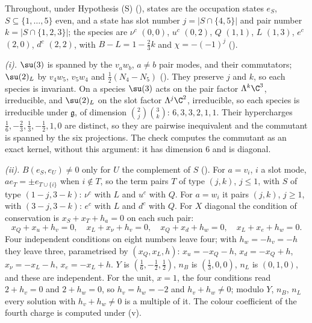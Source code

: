 Throughout, under Hypothesis (S) (), states are the occupation states $e_{S}$, $S \subseteq \{1, \dots, 5\}$ even, and a state has slot number $j = |S \cap \{4, 5\}|$ and pair number $k = |S \cap \{1, 2, 3\}|$; the species are $\nu^{c}$ $(0,0)$, $u^{c}$ $(0,2)$, $Q$ $(1,1)$, $L$ $(1,3)$, $e^{c}$ $(2,0)$, $d^{c}$ $(2,2)$, with $B - L = 1 - \tfrac23 k$ and $\chi = -(-1)^{j}$ ().

\emph{(i).} $\su(3)$ is spanned by the $v_{a}w_{b}$, $a \neq b$ pair modes, and their commutators; $\su(2)_{L}$ by $v_{4}w_{5}$, $v_{5}w_{4}$ and $\tfrac12(N_{4} - N_{5})$ (). They preserve $j$ and $k$, so each species is invariant. On a species $\su(3)$ acts on the pair factor $\Lambda^{k}\C^{3}$, irreducible, and $\su(2)_{L}$ on the slot factor $\Lambda^{j}\C^{2}$, irreducible, so each species is irreducible under $\mathfrak{g}$, of dimension $\binom{2}{j}\binom{3}{k}$: $6, 3, 3, 2, 1, 1$. Their hypercharges $\tfrac16, -\tfrac23, \tfrac13, -\tfrac12, 1, 0$ are distinct, so they are pairwise inequivalent and the commutant is spanned by the six projections. The check computes the commutant as an exact kernel, without this argument: it has dimension $6$ and is diagonal.

\emph{(ii).} $B(e_{S}, e_{U}) \neq 0$ only for $U$ the complement of $S$ (). For $a = v_{i}$, $i$ a slot mode, $a e_{T} = \pm e_{T \cup \{i\}}$ when $i \notin T$, so the term pairs $T$ of type $(j, k)$, $j \le 1$, with $S$ of type $(1 - j, 3 - k)$: $\nu^{c}$ with $L$ and $u^{c}$ with $Q$. For $a = w_{i}$ it pairs $(j, k)$, $j \ge 1$, with $(3 - j, 3 - k)$: $e^{c}$ with $L$ and $d^{c}$ with $Q$. For $X$ diagonal the condition of conservation is $x_{S} + x_{T} + h_{a} = 0$ on each such pair:
\[
x_{Q} + x_{u} + h_{v} = 0, \quad x_{L} + x_{\nu} + h_{v} = 0, \quad x_{Q} + x_{d} + h_{w} = 0, \quad x_{L} + x_{e} + h_{w} = 0 .
\]
Four independent conditions on eight numbers leave four; with $h_{w} = -h_{v} = -h$ they leave three, parametrised by $(x_{Q}, x_{L}, h)$: $x_{u} = -x_{Q} - h$, $x_{d} = -x_{Q} + h$, $x_{\nu} = -x_{L} - h$, $x_{e} = -x_{L} + h$. $Y$ is $(\tfrac16, -\tfrac12, \tfrac12)$, $n_{B}$ is $(\tfrac13, 0, 0)$, $n_{L}$ is $(0, 1, 0)$, and these are independent. For the unit, $x = 1$, the four conditions read $2 + h_{v} = 0$ and $2 + h_{w} = 0$, so $h_{v} = h_{w} = -2$ and $h_{v} + h_{w} \neq 0$; modulo $Y$, $n_{B}$, $n_{L}$ every solution with $h_{v} + h_{w} \neq 0$ is a multiple of it. The colour coefficient of the fourth charge is computed under (v).

